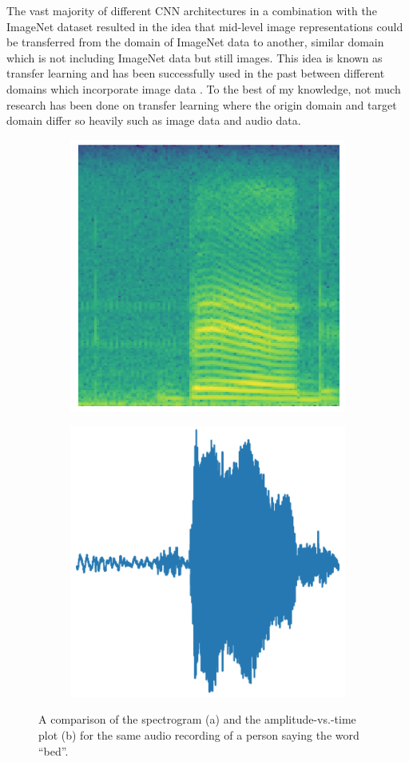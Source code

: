 \documentclass{article}
\theoremstyle{definition}
\theoremstyle{remark}
\begin{document}
The vast majority of different CNN architectures in a combination with the ImageNet dataset resulted in the idea that mid-level image representations could be transferred from the domain of ImageNet data to another, similar domain which is not including ImageNet data but still images. This idea is known as transfer learning and has been successfully used in the past between different domains which incorporate image data \cite{oquab2014learning}. To the best of my knowledge, not much research has been done on transfer learning where the origin domain and target domain differ so heavily such as image data and audio data.\\



\begin{figure}
\centering
\begin{subfigure}{.5\textwidth}
  \centering
  \includegraphics[width=.5\linewidth]{img/papers/image_recognition/spectrogram.png}
  \caption{}
  \label{fig:sub1}
\end{subfigure}%
\begin{subfigure}{.5\textwidth}
  \centering
  \includegraphics[width=.5\linewidth]{img/papers/image_recognition/amplitude_vs_time.png}
  \caption{}
  \label{fig:sub2}
\end{subfigure}
\caption{A comparison of the spectrogram (a) and the
amplitude-vs.-time plot (b) for the same audio recording of
a person saying the word “bed”.}
\label{fig:spectrogram_vs_time_plot}
\end{figure}
\end{document}
